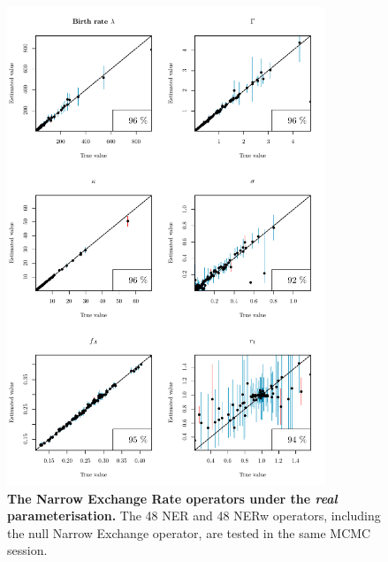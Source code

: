\documentclass[12pt]{article}
\begin{document}
\begin{figure}[!htb]
\includegraphics[width=0.85\textwidth]{Figures/CalSim_NER_real.pdf}
\caption{\textbf{The Narrow Exchange Rate operators under the \textit{real} parameterisation.} The 48 NER and 48 NERw operators, including the null Narrow Exchange operator, are tested in the same MCMC session.}
\label{fig:rateparams}
\end{figure}
\end{document}
